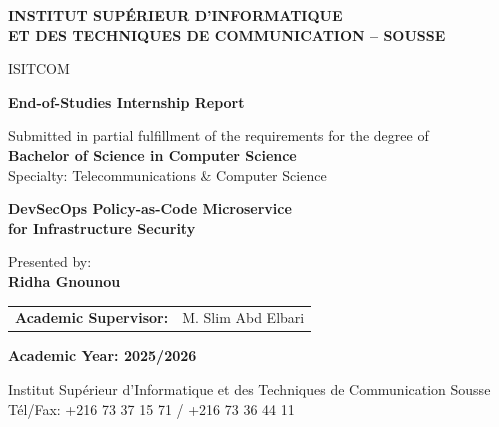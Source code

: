 
\begin{center}

\vspace*{1cm}


{\large \textbf{INSTITUT SUPÉRIEUR D'INFORMATIQUE\\ET DES TECHNIQUES DE COMMUNICATION -- SOUSSE}}

\vspace{0.3cm}
{\small ISITCOM}

\vspace{2cm}

{\Large \textbf{End-of-Studies Internship Report}}

\vspace{0.3cm}

{\normalsize Submitted in partial fulfillment of the requirements for the degree of\\
\textbf{Bachelor of Science in Computer Science}\\
Specialty: Telecommunications \& Computer Science}

\vspace{2cm}

{\LARGE \textbf{DevSecOps Policy-as-Code Microservice\\for Infrastructure Security}}

\vspace{2cm}

{\large Presented by:}\\
\vspace{0.3cm}
{\Large \textbf{Ridha Gnounou}}

\vspace{2cm}

\begin{tabular}{ll}
\textbf{Academic Supervisor:} & M. Slim Abd Elbari \\
\end{tabular}

\vspace{2cm}

{\large \textbf{Academic Year: 2025/2026}}

\vspace{1cm}

{\small Institut Supérieur d'Informatique et des Techniques de Communication Sousse\\
Tél/Fax: +216 73 37 15 71 / +216 73 36 44 11}

\end{center}
